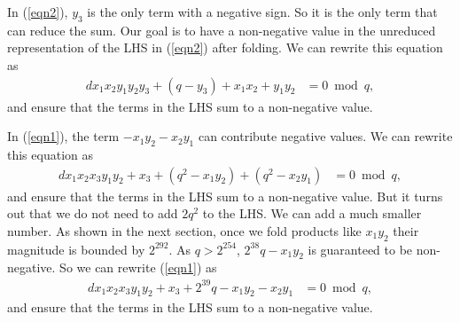 \documentclass[a4paper, 12pt]{article}
\begin{document}
In (\ref{eqn2}), $y_3$ is the only term with a negative sign. So it is the only term that can reduce the sum. Our goal is to have a non-negative value in the unreduced representation of the LHS in (\ref{eqn2}) after folding. We can rewrite this equation as
\begin{align}
  dx_1x_2y_1y_2y_3 + (q - y_3) + x_1x_2 + y_1y_2 &= 0 \bmod q,\label{eqn3}
\end{align}
and ensure that the terms in the LHS sum to a non-negative value.

In (\ref{eqn1}), the term $-x_1y_2-x_2y_1$ can contribute negative values. We can rewrite this equation as
\begin{align}
  dx_1x_2x_3y_1y_2 + x_3 +(q^2 - x_1y_2) + (q^2 - x_2y_1) &= 0 \bmod q,\label{eqn4}
\end{align}
and ensure that the terms in the LHS sum to a non-negative value. But it turns out that we do not need to add $2q^2$ to the LHS. We can add a much smaller number. As shown in the next section, once we fold products like $x_1y_2$ their magnitude is bounded by $2^{292}$. As $q > 2^{254}$, $2^{38}q - x_1y_2$ is guaranteed to be non-negative. So we can rewrite (\ref{eqn1}) as 
\begin{align}
  dx_1x_2x_3y_1y_2 + x_3 + 2^{39}q - x_1y_2 - x_2y_1  &= 0 \bmod q,\label{eqn5}
\end{align}
and ensure that the terms in the LHS sum to a non-negative value.
\end{document}
